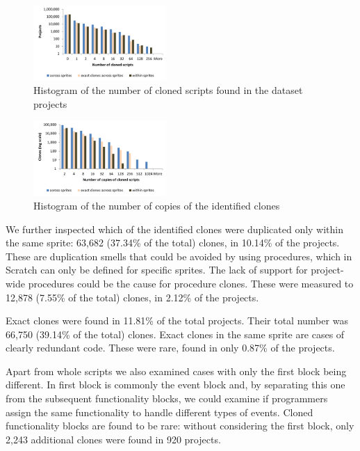 \documentclass{sig-alternate}
\begin{document}
\begin{figure}
	\centering
	\includegraphics[width=0.45\textwidth]{fig/charts/11clonesprojects}
	\caption{Histogram of the number of cloned scripts found in the dataset projects}
	\label{fig:clonesprojects}
\end{figure}

\begin{figure}
	\centering
	\includegraphics[width=0.45\textwidth]{fig/charts/11clonescopies}
	\caption{Histogram of the number of copies of the identified clones}
	\label{fig:clonescopies}
\end{figure}

We further inspected which of the identified clones were duplicated only within the same sprite: 63,682 (37.34\% of the total) clones, in 10.14\% of the projects. These are duplication smells that could be avoided by using procedures, which in Scratch can only be defined for specific sprites. The lack of support for project-wide procedures could be the cause for procedure clones. These were measured to 12,878 (7.55\% of the total) clones, in 2.12\% of the projects.

Exact clones were found in 11.81\% of the total projects. Their total number was 66,750 (39.14\% of the total) clones. Exact clones in the same sprite are cases of clearly redundant code. These were rare, found in only 0.87\% of the projects.

Apart from whole scripts we also examined cases with only the first block being different. In first block is commonly the event block and, by separating this one from the subsequent functionality blocks, we could examine if programmers assign the same functionality to handle different types of events. Cloned functionality blocks are found to be rare: without considering the first block, only 2,243 additional clones were found in 920 projects.
\end{document}
